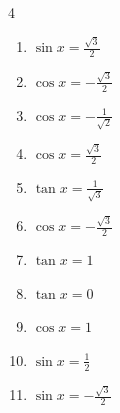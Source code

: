 \begin{multicols}{4}
\begin{enumerate}
  \item $\displaystyle \sin{x}  = \frac{\sqrt{3}}{2}$


  \item $\displaystyle \cos{x}  = -\frac{\sqrt{3}}{2}$


  \item $\displaystyle \cos{x}  = -\frac{1}{\sqrt{2}}$


\columnbreak %

\resetques

  \item $\displaystyle \cos{x}  = \frac{\sqrt{3}}{2}$


  \item $\displaystyle \tan{x}  = \frac{1}{\sqrt{3}}$


  \item $\displaystyle \cos{x}  = -\frac{\sqrt{3}}{2}$


  \item $\displaystyle \tan{x}  = 1$


  \item $\displaystyle \tan{x}  = 0$

        \phantom{$\displaystyle x = 0 , \pi$}

  \item $\displaystyle \cos{x}  = 1$

        \phantom{$\displaystyle x = 0$}

  \item $\displaystyle \sin{x}  = \frac{1}{2}$


  \item $\displaystyle \sin{x}  = -\frac{\sqrt{3}}{2}$



\end{enumerate}
\end{multicols}
